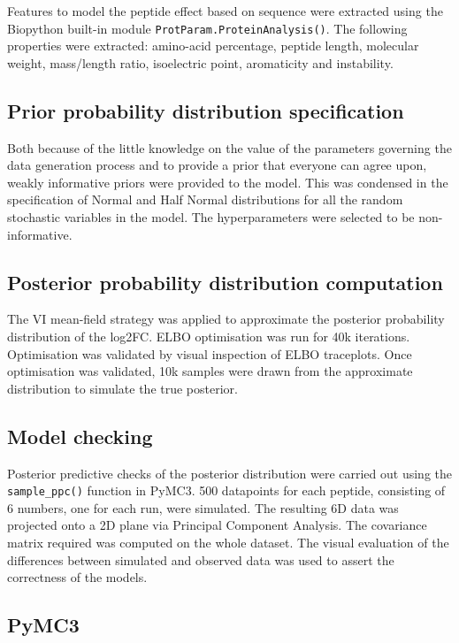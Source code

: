 Features to model the peptide effect based on sequence were extracted using the Biopython \cite{Cock2009} built-in  module \texttt{ProtParam.ProteinAnalysis()}. The following properties were extracted: amino-acid percentage, peptide length, molecular weight, mass/length ratio, isoelectric point, aromaticity and instability.


\subsection{Prior probability distribution specification}

Both because of the little knowledge on the value of the parameters governing the data generation process and to provide a prior that everyone can agree upon, weakly informative priors were provided to the model. This was condensed in the specification of Normal and Half Normal distributions for all the random stochastic variables in the model. The hyperparameters were selected to be non-informative.

\subsection{Posterior probability distribution computation}
\label{subsec:posterior_compute}

The \ac{VI} mean-field strategy was applied to approximate the posterior probability distribution of the \ac{log2FC}. \ac{ELBO} optimisation was run for 40k iterations. Optimisation was validated by visual inspection of \ac{ELBO} traceplots. Once optimisation was validated, 10k samples were drawn from the approximate distribution to simulate the true posterior.

\subsection{Model checking}

Posterior predictive checks of the posterior distribution were carried out using the \texttt{sample\_ppc()} function in PyMC3. 500 datapoints for each peptide, consisting of 6 numbers, one for each run, were simulated. The resulting 6D data was projected onto a 2D plane via Principal Component Analysis. The covariance matrix required was computed on the whole dataset. The visual evaluation of the differences between simulated and observed data was used to assert the correctness of the models.

\subsection{PyMC3}


